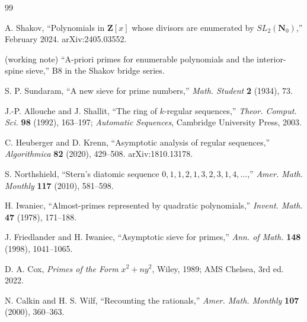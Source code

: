 \documentclass[11pt]{article}
\theoremstyle{definition}
\newcommand{\Nz}{\mathbf{N}_0}
\newcommand{\Z}{\mathbf{Z}}
\newcommand{\SLNz}{SL_2(\Nz)}
\begin{document}
\begin{thebibliography}{99}

A. Shakov, ``Polynomials in $\Z[x]$ whose divisors are enumerated by $\SLNz$,'' February 2024. arXiv:2405.03552.

(working note) ``A-priori primes for enumerable polynomials and the interior-spine sieve,'' B8 in the Shakov bridge series.

S. P. Sundaram, ``A new sieve for prime numbers,'' \emph{Math. Student} \textbf{2} (1934), 73.

J.-P. Allouche and J. Shallit, ``The ring of $k$-regular sequences,'' \emph{Theor. Comput. Sci.} \textbf{98} (1992), 163--197; \emph{Automatic Sequences}, Cambridge University Press, 2003.

C. Heuberger and D. Krenn, ``Asymptotic analysis of regular sequences,'' \emph{Algorithmica} \textbf{82} (2020), 429--508. arXiv:1810.13178.

S. Northshield, ``Stern's diatomic sequence $0, 1, 1, 2, 1, 3, 2, 3, 1, 4, \ldots$,'' \emph{Amer. Math. Monthly} \textbf{117} (2010), 581--598.

H. Iwaniec, ``Almost-primes represented by quadratic polynomials,'' \emph{Invent. Math.} \textbf{47} (1978), 171--188.

J. Friedlander and H. Iwaniec, ``Asymptotic sieve for primes,'' \emph{Ann. of Math.} \textbf{148} (1998), 1041--1065.

D. A. Cox, \emph{Primes of the Form $x^2 + ny^2$}, Wiley, 1989; AMS Chelsea, 3rd ed. 2022.

N. Calkin and H. S. Wilf, ``Recounting the rationals,'' \emph{Amer. Math. Monthly} \textbf{107} (2000), 360--363.

\end{thebibliography}
\end{document}
